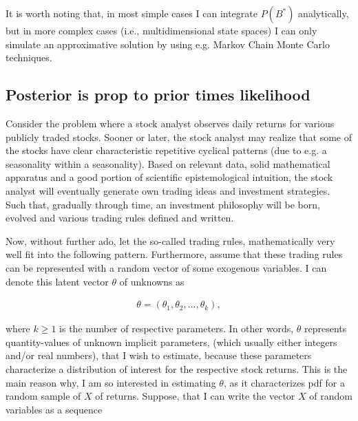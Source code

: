 \documentclass[a4paper,11pt,english]{article}
\begin{document}
		\noindent It is worth noting that, in most simple cases I can integrate $P(B^\ast)$ analytically, but in more complex cases (i.e., 
		multidimensional state spaces) I can only simulate an approximative solution by using e.g. Markov Chain Monte Carlo techniques. 
	
		\subsection{Posterior is prop to prior times likelihood}

		Consider the problem where a stock analyst observes daily returns for various publicly traded stocks. Sooner or later, the stock analyst may 
		realize that some of the stocks have clear characteristic repetitive cyclical patterns (due to e.g. a seasonality within a seasonality). Based on 
		relevant data, solid mathematical apparatus and a good portion of scientific epistemological intuition, the stock analyst will eventually generate 
		own trading ideas and investment strategies. Such that, gradually through time, an investment philosophy will be born, evolved and various trading 
		rules defined and written. 
	
		Now, without further ado, let the so-called trading rules, mathematically very well fit into the following pattern. Furthermore, assume that these 
		trading rules can be represented with a random vector of some exogenous variables. I can denote this latent vector $\theta$ of unknowns as 

		\begin{eqnarray*}
			\theta = (\theta_1, \theta_2, \ldots, \theta_k), 		
		\end{eqnarray*}	

		\noindent where $k \geq 1$ is the number of respective parameters. In other words, $\theta$ represents quantity-values of unknown implicit 
		parameters, (which usually either integers and/or real numbers), that I wish to estimate, because these parameters characterize a distribution of 
		interest for the respective stock returns.  This is the main reason why, I am so interested in estimating $\theta$, as it characterizes pdf for a 
		random sample of $X$ of returns. Suppose, that I can write the vector $X$ of random variables as a sequence 
		
\end{document}
